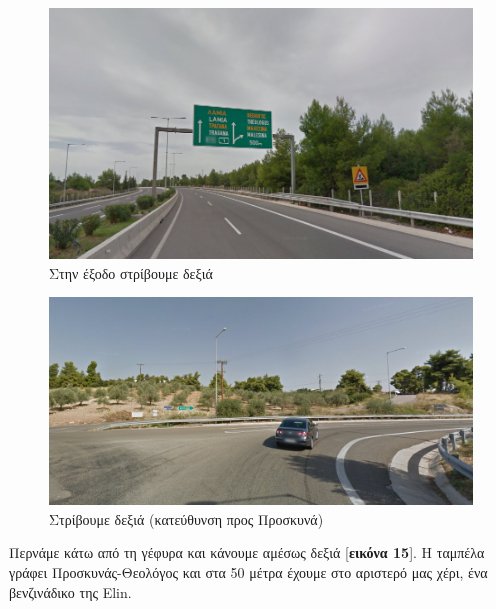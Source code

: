 \begin{figure}[hbp!]
	\centering
		\includegraphics[width=\textwidth]{images/athina-lamia/tragana/tragana1.PNG}
			\caption{Στην έξοδο στρίβουμε δεξιά}
	
\end{figure}
\begin{figure}[hbp!]
	\centering
		\includegraphics[width=\textwidth]{images/athina-lamia/tragana/tragana2.PNG}
			\caption{Στρίβουμε δεξιά (κατεύθυνση προς Προσκυνά)}
\end{figure}
\break			
Περνάμε κάτω από τη γέφυρα και κάνουμε αμέσως δεξιά [\textbf{εικόνα 15}]. Η ταμπέλα γράφει Προσκυνάς-Θεολόγος και στα 50 μέτρα έχουμε στο αριστερό μας χέρι, ένα βενζινάδικο της Elin.

